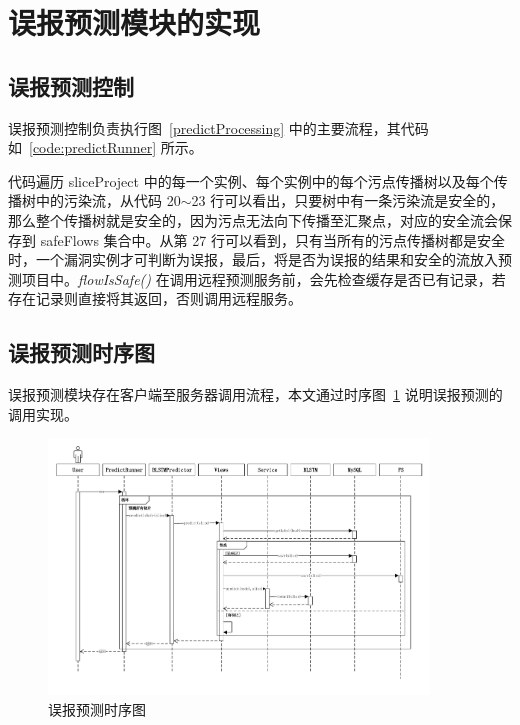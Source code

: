 \section{误报预测模块的实现}

\subsection{误报预测控制}
误报预测控制负责执行图~\ref{predictProcessing} 中的主要流程，其代码如~\ref{code:predictRunner} 所示。

\begin{minipage}[!htbp]{0.9\textwidth}
    
\end{minipage}

代码遍历 sliceProject 中的每一个实例、每个实例中的每个污点传播树以及每个传播树中的污染流，从代码 20$\sim$23 行可以看出，只要树中有一条污染流是安全的，那么整个传播树就是安全的，因为污点无法向下传播至汇聚点，对应的安全流会保存到 safeFlows 集合中。从第 27 行可以看到，只有当所有的污点传播树都是安全时，一个漏洞实例才可判断为误报，最后，将是否为误报的结果和安全的流放入预测项目中。\textit{flowIsSafe()} 在调用远程预测服务前，会先检查缓存是否已有记录，若存在记录则直接将其返回，否则调用远程服务。\\

\subsection{误报预测时序图}
误报预测模块存在客户端至服务器调用流程，本文通过时序图~\ref{predictTime} 说明误报预测的调用实现。

\begin{figure}[!htb]
    \centering
    \includegraphics[width=0.9\textwidth]{FIGs/chapter4/predictTime.pdf}
    \caption{误报预测时序图}\label{predictTime}
\end{figure}


